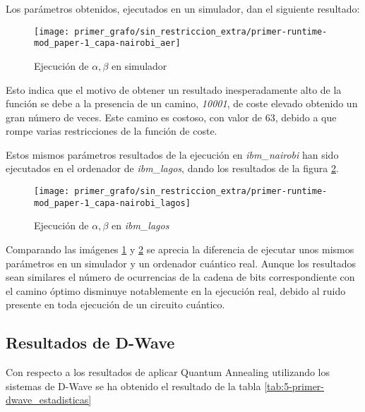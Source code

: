 \documentclass{article}
\begin{document}
Los parámetros obtenidos, ejecutados en un simulador, dan el siguiente resultado:
\begin{figure}[htbp]
  \centering
  \texttt{[image: primer\_grafo/sin\_restriccion\_extra/primer-runtime-mod\_paper-1\_capa-nairobi\_aer]}
  \caption{Ejecución de \(\alpha, \beta\) en simulador}
  \label{fig:5-primer_grafo/sin_restriccion_extra/primer-runtime-mod_paper-1_capa-nairobi_aer}
\end{figure}

Esto indica que el motivo de obtener un resultado inesperadamente alto de la función se debe a la presencia de un camino, \textit{10001}, de coste elevado obtenido un gran número de veces. Este camino es costoso, con valor de 63, debido a que rompe varias restricciones de la función de coste.

Estos mismos parámetros resultados de la ejecución en \textit{ibm\_nairobi} han sido ejecutados en el ordenador de \textit{ibm\_lagos}, dando los resultados de la figura \ref{fig:5-primer_grafo/sin_restriccion_extra/primer-runtime-mod_paper-1_capa-nairobi_lagos}.
\begin{figure}[htbp]
  \centering
  \texttt{[image: primer\_grafo/sin\_restriccion\_extra/primer-runtime-mod\_paper-1\_capa-nairobi\_lagos]}
  \caption{Ejecución de \(\alpha, \beta\) en \textit{ibm\_lagos}}
  \label{fig:5-primer_grafo/sin_restriccion_extra/primer-runtime-mod_paper-1_capa-nairobi_lagos}
\end{figure}

Comparando las imágenes
\ref{fig:5-primer_grafo/sin_restriccion_extra/primer-runtime-mod_paper-1_capa-nairobi_aer}
y \ref{fig:5-primer_grafo/sin_restriccion_extra/primer-runtime-mod_paper-1_capa-nairobi_lagos}
se aprecia la diferencia de ejecutar unos mismos parámetros en un simulador y un ordenador cuántico real. Aunque los resultados sean similares el número de ocurrencias de la cadena de bits correspondiente con el camino óptimo disminuye notablemente en la ejecución real, debido al ruido presente en toda ejecución de un circuito cuántico.

\newpage


\subsection{Resultados de D-Wave}
Con respecto a los resultados de aplicar Quantum Annealing utilizando los sistemas de D-Wave se ha obtenido el resultado de la tabla \ref{tab:5-primer-dwave_estadisticas}
\end{document}
